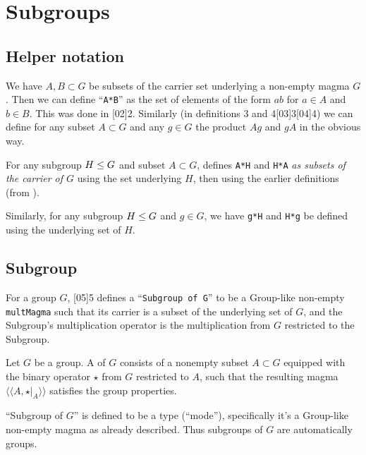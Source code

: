 \section{Subgroups}

\subsection{Helper notation}
We have $A,B\subset G$ be subsets of the carrier set underlying a
non-empty magma $G$. Then we can define ``\lstinline{A*B}'' as the set of
elements of the form $ab$ for $a\in A$ and $b\in B$. This was done in
[02]{2}. Similarly (in definitions
3 and 4[03]{3}[04]{4}) we can define
for any subset $A\subset G$ and any $g\in G$ the product $Ag$ and $gA$
in the obvious way.

For any subgroup $H\leq G$ and subset $A\subset G$,
 defines \lstinline{A*H} and
\lstinline{H*A} \emph{as subsets of the carrier of $G$} using the set
underlying $H$, then using the earlier definitions (from
).

Similarly, for any subgroup $H\leq G$ and $g\in G$, we have
\lstinline{g*H} and \lstinline{H*g} be defined using the underlying set of $H$.

\subsection{Subgroup}
For a group $G$, [05]{5} defines a
``\lstinline{Subgroup of G}'' to be a Group-like non-empty \lstinline{multMagma}
such that its carrier is a subset of the underlying set of $G$, and the
Subgroup's multiplication operator is the multiplication from $G$
restricted to the Subgroup.

\begin{definition}
Let $G$ be a group. A  of $G$ consists of a nonempty
subset $A\subset G$ equipped with the binary operator $\star$ from $G$
restricted to $A$, such that the resulting magma $\langle\!\langle A,\star|_{A}\rangle\!\rangle$
satisfies the group properties.
\end{definition}

\begin{def-remark}
``Subgroup of $G$'' is defined to be a type (``mode''), specifically
it's a Group-like non-empty magma as already described. Thus subgroups
of $G$ are automatically groups.
\end{def-remark}


